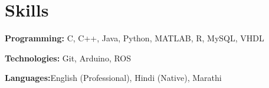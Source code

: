 \documentclass[letterpaper,11pt]{article}
\makeatletter
\newcommand{\resumeOrganizationHeading}[4]{
  \vspace{-2pt}\item
    \begin{tabular*}{0.97\textwidth}[t]{l@{\extracolsep{\fill}}r}
      \textbf{#1} & \textit{\small #2} \\
      \textit{\small#3}
    \end{tabular*}\vspace{-7pt}
}
\newcommand{\resumeSubHeadingListStart}{\begin{itemize}[leftmargin=0.15in, label={}]}
\newcommand{\resumeSubHeadingListEnd}{\end{itemize}}
\makeatother
\begin{document}
\section{Skills}
  \vspace{1pt}
  \resumeSubHeadingListStart
    \small{\item{
        \textbf{Programming:}{ C, C++, Java, Python, MATLAB, R, MySQL, VHDL} \\ \vspace{2pt}
        
        \textbf{Technologies:}{ Git, Arduino, ROS} \\ \vspace{2pt}
        
        \textbf{Languages:}{English (Professional), Hindi (Native), Marathi }
        
    }}
  \resumeSubHeadingListEnd




    
    




    
    
\end{document}
